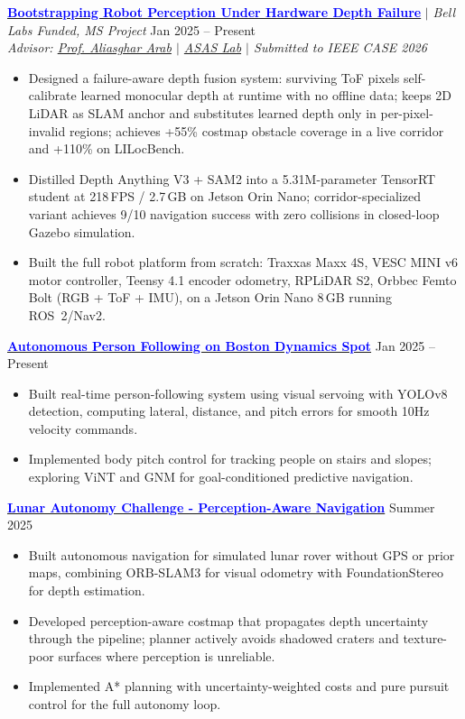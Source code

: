 \documentclass[10pt,letterpaper]{article}
\begin{document}
\href{https://github.com/vivekmattam02/ros2-ackermann-racing-navigation}{\textcolor{blue}{\textbf{Bootstrapping Robot Perception Under Hardware Depth Failure}}} $|$ \textit{Bell Labs Funded, MS Project} \hfill Jan 2025 -- Present \\
\textit{Advisor: \href{https://wp.nyu.edu/aarab/}{Prof. Aliasghar Arab} $|$ \href{https://wp.nyu.edu/asas_labs/about-project/}{ASAS Lab} $|$ Submitted to IEEE CASE 2026}
\begin{itemize}
    \item Designed a failure-aware depth fusion system: surviving ToF pixels self-calibrate learned monocular depth at runtime with no offline data; keeps 2D LiDAR as SLAM anchor and substitutes learned depth only in per-pixel-invalid regions; achieves +55\% costmap obstacle coverage in a live corridor and +110\% on LILocBench.
    \item Distilled Depth Anything V3 + SAM2 into a 5.31M-parameter TensorRT student at 218\,FPS / 2.7\,GB on Jetson Orin Nano; corridor-specialized variant achieves 9/10 navigation success with zero collisions in closed-loop Gazebo simulation.
    \item Built the full robot platform from scratch: Traxxas Maxx 4S, VESC MINI v6 motor controller, Teensy 4.1 encoder odometry, RPLiDAR S2, Orbbec Femto Bolt (RGB + ToF + IMU), on a Jetson Orin Nano 8\,GB running ROS~2/Nav2.
\end{itemize}
\vspace{1pt}

\href{https://github.com/vivekmattam02/spot}{\textcolor{blue}{\textbf{Autonomous Person Following on Boston Dynamics Spot}}} \hfill Jan 2025 -- Present
\begin{itemize}
    \item Built real-time person-following system using visual servoing with YOLOv8 detection, computing lateral, distance, and pitch errors for smooth 10Hz velocity commands.
    \item Implemented body pitch control for tracking people on stairs and slopes; exploring ViNT and GNM for goal-conditioned predictive navigation.
\end{itemize}
\vspace{1pt}

\href{https://github.com/vivekmattam02/LAC_26}{\textcolor{blue}{\textbf{Lunar Autonomy Challenge - Perception-Aware Navigation}}} \hfill Summer 2025
\begin{itemize}
    \item Built autonomous navigation for simulated lunar rover without GPS or prior maps, combining ORB-SLAM3 for visual odometry with FoundationStereo for depth estimation.
    \item Developed perception-aware costmap that propagates depth uncertainty through the pipeline; planner actively avoids shadowed craters and texture-poor surfaces where perception is unreliable.
    \item Implemented A* planning with uncertainty-weighted costs and pure pursuit control for the full autonomy loop.
\end{itemize}
\vspace{1pt}
\end{document}
